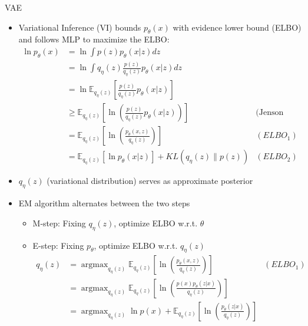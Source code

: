 \documentclass[compress]{beamer}
\newcommand{\expects}[2]{\mathbb{E}_{#1} \left[ #2 \right]}
\begin{document}
\begin{frame}[allowframebreaks]{VAE}
    \begin{itemize}
        \item Variational Inference (VI) bounds $p_{\theta}(x)$ with evidence lower bound (ELBO) and follows MLP to maximize the ELBO:
            \begin{align*}
                \ln p_{\theta}(x) & = \ln \int p(z)p_{\theta}(x|z) dz & \\
                                  & =  \ln \int q_{\eta}(z) \frac{p(z)}{q_{\eta}(z)} p_{\theta}(x|z) dz & \\
                                  & =  \ln \expects{q_{\eta}(z)}{ \frac{p(z)}{q_{\eta}(z)} p_{\theta}(x|z)}&  \\
                                  & \ge \expects{q_{\eta}(z)}{ \ln \left(  \frac{p(z)}{q_{\eta}(z)} p_{\theta}(x|z)\right) } & \text{(Jenson Inequality)}\\
                                  & = \expects{q_{\eta}(z)}{ \ln \left(  \frac{p_{\theta}(x,z)}{q_{\eta}(z)} \right) } & (ELBO_1)\\
                                  & = \expects{q_{\eta}(z)}{\ln p_{\theta}(x|z)} + KL(q_{\eta}(z)\|p(z)) & (ELBO_2)
            \end{align*}
    \end{itemize}
    \framebreak
    \begin{itemize}
        \item $q_{\eta}(z)$ (variational distribution) serves as approximate posterior
        \item EM algorithm alternates between the two steps
            \begin{itemize}
                \item M-step: Fixing $q_{\eta}(z)$, optimize ELBO w.r.t. $\theta$ \\
                \item E-step: Fixing $p_{\theta}$, optimize ELBO w.r.t. $q_{\eta}(z)$
                    \begin{align*}
                        q_{\eta}(z) &  = \mathop{argmax}_{q_\eta(z)}\expects{q_{\eta}(z)}{ \ln \left(  \frac{p_{\theta}(x,z)}{q_{\eta}(z)} \right) } & (ELBO_1)\\
                                    &  = \mathop{argmax}_{q_\eta(z)}\expects{q_{\eta}(z)}{ \ln \left(  \frac{p(x)p_{\theta}(z|x)}{q_{\eta}(z)} \right) } & \\
                                    &  = \mathop{argmax}_{q_\eta(z)} \ln p(x) + \expects{q_{\eta}(z)}{ \ln \left(  \frac{p_{\theta}(z|x)}{q_{\eta}(z)} \right) } & \\

\end{align*}
\end{itemize}
\end{itemize}
\end{frame}
\end{document}
